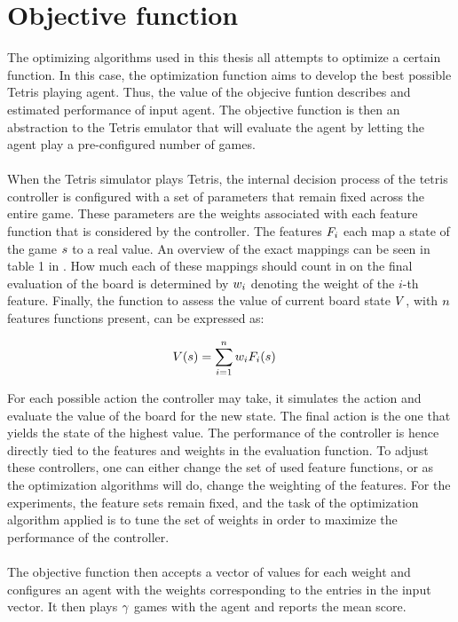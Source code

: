 \section{Objective function}

The optimizing algorithms used in this thesis all attempts to 
optimize a certain function. In this case, the optimization 
function aims to develop the best possible Tetris playing agent.
Thus, the value of the objecive funtion describes and estimated 
performance of input agent. The objective function is then 
an abstraction to the Tetris emulator that will evaluate 
the agent by letting the agent play a pre-configured number 
of games.\\
\\
When the Tetris simulator plays Tetris, the internal decision process
of the tetris controller is configured with a set of parameters that remain
fixed across the entire game. These parameters are the weights associated 
with each feature function that is considered by the controller. The features $F _{i}$
each map a state of the game $s$ to a real value. An overview of the exact mappings
can be seen in table 1 in \citep{scherrer2009:b}. How much each of these mappings
should count in on the final evaluation of the board is determined by $w _{i}$
denoting the weight of the $i$-th feature. Finally, the function to assess the value 
of current board state $V$, with $n$ features functions present, can be expressed as:

\begin{align*}
V (s ) &= \sum_{i=1}^{n} w _{i}F _{i}(s )
\end{align*}

For each possible action the controller may take, it simulates 
the action and evaluate the value of the board for the new state. 
The final action is the one that yields the state of the highest value.
The performance of the controller is hence directly tied to the 
features and weights in the evaluation function. To adjust these controllers,
one can either change the set of used feature functions, or as the 
optimization algorithms will do, change the weighting of the features.
For the experiments, the feature sets remain fixed, and the task of the
optimization algorithm applied is to tune the set of weights in order 
to maximize the performance of the controller.\\
\\
The objective function then accepts a vector of values for each weight
and configures an agent with the weights corresponding to the entries in
the input vector. It then plays $\gamma$ games with the
agent and reports the mean score.

